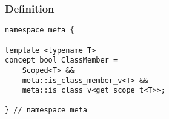 
\subsubsection{Definition}

\begin{verbatim}
namespace meta {

template <typename T>
concept bool ClassMember =
	Scoped<T> &&
	meta::is_class_member_v<T> &&
	meta::is_class_v<get_scope_t<T>>;

} // namespace meta
\end{verbatim}
